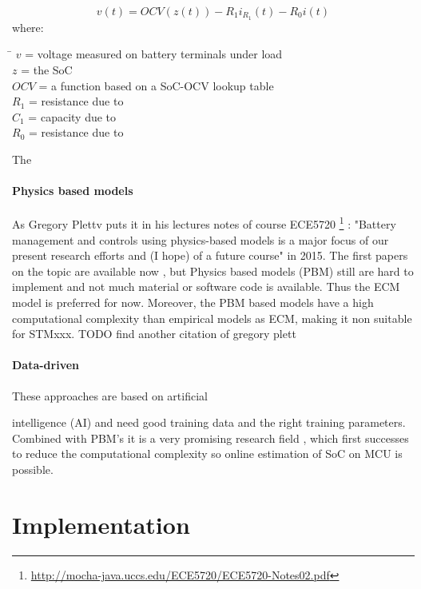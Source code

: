 \begin{equation}
{v}(t) = {OCV}(z(t)) - {R}_{1} {i}_{R_1}(t) - {R}_{0} i(t)
\end{equation}
where: 
\begin{tabbing}
\phantom{$v(t)  \  \ \ \ $}\= \kill
$v$\> =  voltage measured on battery terminals under load   \\
$z  $\> = the SoC  \\
$OCV $\>  = a function based on a SoC-OCV lookup table \\
$R_1$\> = resistance due to \\
$C_1$\> = capacity due to \\
$R_0$\> = resistance due to \\
\end{tabbing}

The 



\subsubsection{Physics based models}

As Gregory Plettv puts it in his lectures notes of course ECE5720  \footnote{ \url{http://mocha-java.uccs.edu/ECE5720/ECE5720-Notes02.pdf}} :  "Battery management and controls using physics-based models is a major focus of our present research efforts and (I hope) of a future
course" in 2015. The first papers on the topic are available now \cite{9477587}, but Physics based models (PBM) still are hard to implement and not much material or software code is available. Thus the ECM model is preferred for now. Moreover, the PBM based models have a high computational complexity than
empirical models as ECM, making it non suitable for STMxxx. TODO find another citation of gregory plett


\subsubsection{Data-driven}

These approaches are based on artificial

intelligence (AI) and need good training data and the right training parameters. Combined with PBM's it is a very promising research field \cite{9477587}, which first successes to reduce the computational complexity so online estimation of SoC on MCU is	 possible.


\chapter{Implementation}

